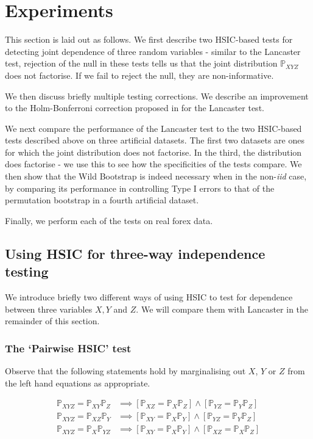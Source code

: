 \documentclass[12pt]{article}
\numberwithin{claim}{section}
\numberwithin{lemma}{section}
\numberwithin{theorem}{section}
\begin{document}
\section{Experiments}

This section is laid out as follows. We first describe two HSIC-based tests for detecting joint dependence of three random variables - similar to the Lancaster test,  rejection of the null in these tests tells us that the joint distribution $\mathbb{P}_{XYZ}$ does not factorise. If we fail to reject the null, they are non-informative.

We then discuss briefly multiple testing corrections. We describe an improvement to the Holm-Bonferroni correction \cite{holm1979simple} proposed in \cite{sejdinovic2013kernel} for the Lancaster test.

We next compare the performance of the Lancaster test to the two HSIC-based tests described above on three artificial datasets. The first two datasets are ones for which the joint distribution does not factorise. In the third, the distribution does factorise - we use this to see how the specificities of the tests compare. We then show that the Wild Bootstrap is indeed necessary when in the non-\emph{iid} case, by comparing its performance in controlling Type I errors to that of the permutation bootstrap in a fourth artificial dataset. 

Finally, we perform each of the tests on real forex data.

\subsection{Using HSIC for three-way independence testing}

We introduce briefly two different ways of using HSIC to test for dependence between three variables $X,Y$ and $Z$. We will compare them with Lancaster in the remainder of this section.

\subsubsection{The `Pairwise HSIC' test}
Observe that the following statements hold by marginalising out $X$, $Y$ or $Z$ from the left hand equations as appropriate.

\begin{align*}
\mathbb{P}_{XYZ } = \mathbb{P}_{XY}\mathbb{P}_{Z} & \implies [\mathbb{P}_{XZ } = \mathbb{P}_{X}\mathbb{P}_{Z}] \land [\mathbb{P}_{YZ } = \mathbb{P}_{Y}\mathbb{P}_{Z}]\\
\mathbb{P}_{XYZ } = \mathbb{P}_{XZ}\mathbb{P}_{Y} & \implies [\mathbb{P}_{XY } = \mathbb{P}_{X}\mathbb{P}_{Y}] \land [\mathbb{P}_{YZ } = \mathbb{P}_{Y}\mathbb{P}_{Z}]\\
\mathbb{P}_{XYZ } = \mathbb{P}_{X}\mathbb{P}_{YZ} & \implies [\mathbb{P}_{XY } = \mathbb{P}_{X}\mathbb{P}_{Y}] \land [\mathbb{P}_{XZ } = \mathbb{P}_{X}\mathbb{P}_{Z}]\\
\end{align*}
\end{document}
